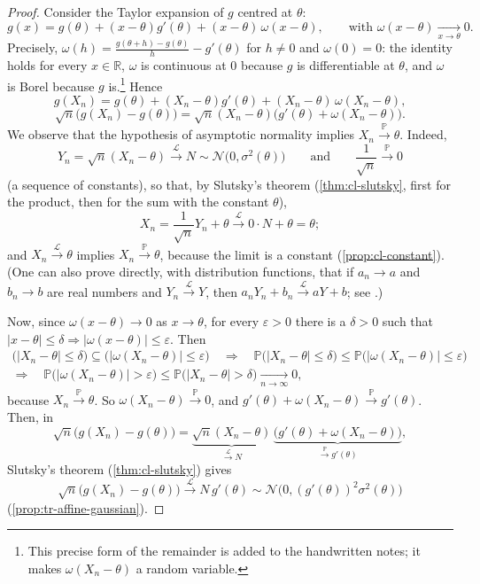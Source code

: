 \begin{proof}
Consider the Taylor expansion of $g$ centred at $\theta$:
\[
  g(x)=g(\theta)+(x-\theta)g'(\theta)+(x-\theta)\,\omega(x-\theta),\qquad\text{with }
  \omega(x-\theta)\xrightarrow[x\to\theta]{}0 .
\]
Precisely, $\omega(h)=\frac{g(\theta+h)-g(\theta)}h-g'(\theta)$ for $h\neq0$ and $\omega(0)=0$:
the identity holds for every $x\in\mathbb R$, $\omega$ is continuous at $0$ because $g$ is
differentiable at $\theta$, and $\omega$ is Borel because $g$ is.\footnote{This precise form of
the remainder is added to the handwritten notes; it makes $\omega(X_n-\theta)$ a random variable.}
Hence
\[
  g(X_n)=g(\theta)+(X_n-\theta)g'(\theta)+(X_n-\theta)\,\omega(X_n-\theta),
\]
\[
  \sqrt n\big(g(X_n)-g(\theta)\big)=\sqrt n(X_n-\theta)\big(g'(\theta)+\omega(X_n-\theta)\big).
\]
We observe that the hypothesis of asymptotic normality implies $X_n\xrightarrow{\mathbb P}\theta$.
Indeed,
\[
  Y_n=\sqrt n(X_n-\theta)\xrightarrow{\mathcal L}N\sim\mathcal N\big(0,\sigma^2(\theta)\big)
  \qquad\text{and}\qquad\frac1{\sqrt n}\xrightarrow{\mathbb P}0
\]
(a sequence of constants), so that, by Slutsky's theorem (\cref{thm:cl-slutsky}, first for the
product, then for the sum with the constant $\theta$),
\[
  X_n=\frac1{\sqrt n}Y_n+\theta\xrightarrow{\mathcal L}0\cdot N+\theta=\theta ;
\]
and $X_n\xrightarrow{\mathcal L}\theta$ implies $X_n\xrightarrow{\mathbb P}\theta$, because the
limit is a constant (\cref{prop:cl-constant}). (One can also prove directly, with distribution
functions, that if $a_n\to a$ and $b_n\to b$ are real numbers and $Y_n\xrightarrow{\mathcal L}Y$,
then $a_nY_n+b_n\xrightarrow{\mathcal L}aY+b$; see .)

Now, since $\omega(x-\theta)\to0$ as $x\to\theta$, for every $\varepsilon>0$ there is a
$\delta>0$ such that $|x-\theta|\le\delta\Rightarrow|\omega(x-\theta)|\le\varepsilon$. Then
\[
\begin{gathered}
  \big(|X_n-\theta|\le\delta\big)\subseteq\big(|\omega(X_n-\theta)|\le\varepsilon\big)
  \quad\Longrightarrow\quad
  \mathbb P\big(|X_n-\theta|\le\delta\big)\le\mathbb P\big(|\omega(X_n-\theta)|\le\varepsilon\big)\\
  \Longrightarrow\quad\mathbb P\big(|\omega(X_n-\theta)|>\varepsilon\big)\le\mathbb P\big(|X_n-\theta|>\delta\big)
  \xrightarrow[n\to\infty]{}0,
\end{gathered}
\]
because $X_n\xrightarrow{\mathbb P}\theta$. So $\omega(X_n-\theta)\xrightarrow{\mathbb P}0$, and
$g'(\theta)+\omega(X_n-\theta)\xrightarrow{\mathbb P}g'(\theta)$. Then, in
\[
  \sqrt n\big(g(X_n)-g(\theta)\big)=\underbrace{\sqrt n(X_n-\theta)}_{\xrightarrow{\mathcal L}N}\,
  \underbrace{\big(g'(\theta)+\omega(X_n-\theta)\big)}_{\xrightarrow{\mathbb P}g'(\theta)},
\]
Slutsky's theorem (\cref{thm:cl-slutsky}) gives
\[
  \sqrt n\big(g(X_n)-g(\theta)\big)\xrightarrow{\mathcal L}N\,g'(\theta)
  \sim\mathcal N\big(0,(g'(\theta))^2\sigma^2(\theta)\big)
\]
(\cref{prop:tr-affine-gaussian}).
\end{proof}


